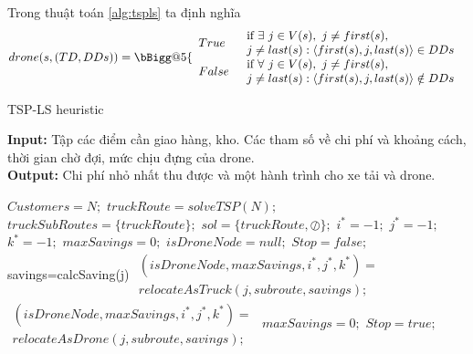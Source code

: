 \documentclass[a4paper,12pt]{report}
\makeatletter
\newcommand{\Vast}{\bBigg@{5}}
\makeatother
\begin{document}
Trong thuật toán  \ref{alg:tspls} ta định nghĩa 
$$
drone(s,(TD,DDs))= \Vast\{
\begin{array}{ll}
		True & \begin{array}{l}
		\text{if}	\	\exists \ j \in V(s),\ j \neq first(s), \\ j \neq last(s): \langle first(s),j,last(s) \rangle \in DDs
		\end{array}  \\
		False &  \begin{array}{l}
		\text{if}	\	\forall \ j \in V(s),\ j \neq first(s), \\ j \neq last(s): \langle first(s),j,last(s) \rangle \notin DDs
		\end{array}
\end{array}
$$
\begin{algorithm}[H]
\caption{TSP-LS heuristic}
\textbf{Input:} Tập các điểm cần giao hàng, kho. Các tham số về chi phí và khoảng cách, thời gian chờ đợi, mức chịu đựng của drone.\\
\textbf{Output:} Chi phí nhỏ nhất thu được và một hành trình cho xe tải và drone.
\begin{algorithmic}[1]
\State $Customers = N ;$
\State $truckRoute = solveTSP(N);$
\State $truckSubRoutes = \{truckRoute\};$
\State $sol = \{truckRoute,  \oslash \};$
\State $i^*=-1;$
\State $j^*=-1;$
\State $k^*=-1;$
\State $maxSavings = 0;$
\State $isDroneNode = null;$
\State $Stop = f alse;$
\Repeat
{}
\State savings=calcSaving(j)
\State $\begin{array}{l}
	(isDroneNode,maxSavings,i^*,j^*,k^*)=\\
	relocateAsTruck(j,subroute,savings);
\end{array}$ 
\Else
\State $\begin{array}{l}
(isDroneNode,maxSavings,i^*,j^*,k^*)= \\ relocateAsDrone(j,subroute,savings);
\end{array}$
\EndIf
\EndFor
{} 
\State $maxSavings=0;$
\Else 
\State $Stop=true;$
\EndIf
\EndFor
{}
\end{algorithmic}
\label{alg:tspls}
\end{algorithm}
\end{document}
